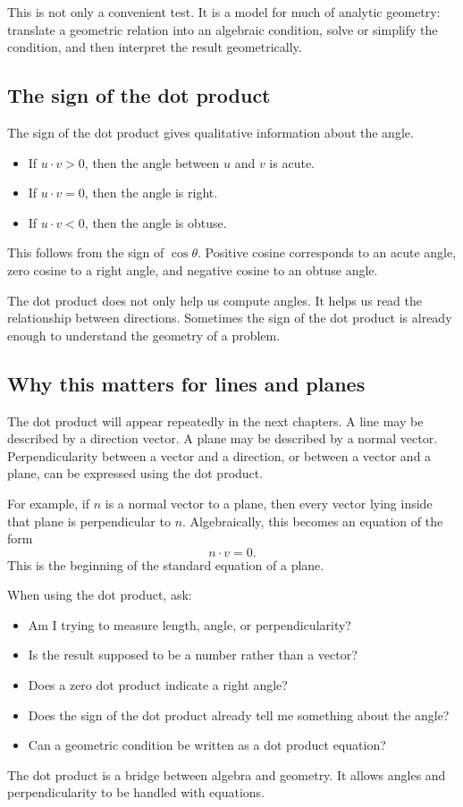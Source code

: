 This is not only a convenient test. It is a model for much of analytic geometry: translate a geometric relation into an algebraic condition, solve or simplify the condition, and then interpret the result geometrically.

\subsection*{The sign of the dot product}

The sign of the dot product gives qualitative information about the angle.

\begin{itemize}
\item If \(u\cdot v>0\), then the angle between \(u\) and \(v\) is acute.
\item If \(u\cdot v=0\), then the angle is right.
\item If \(u\cdot v<0\), then the angle is obtuse.
\end{itemize}

This follows from the sign of \(\cos\theta\). Positive cosine corresponds to an acute angle, zero cosine to a right angle, and negative cosine to an obtuse angle.

\begin{remarkbox}
The dot product does not only help us compute angles. It helps us read the relationship between directions. Sometimes the sign of the dot product is already enough to understand the geometry of a problem.
\end{remarkbox}

\subsection*{Why this matters for lines and planes}

The dot product will appear repeatedly in the next chapters. A line may be described by a direction vector. A plane may be described by a normal vector. Perpendicularity between a vector and a direction, or between a vector and a plane, can be expressed using the dot product.

For example, if \(n\) is a normal vector to a plane, then every vector lying inside that plane is perpendicular to \(n\). Algebraically, this becomes an equation of the form
\[
n\cdot v=0.
\]
This is the beginning of the standard equation of a plane.

\begin{summarybox}
When using the dot product, ask:
\begin{itemize}
\item Am I trying to measure length, angle, or perpendicularity?
\item Is the result supposed to be a number rather than a vector?
\item Does a zero dot product indicate a right angle?
\item Does the sign of the dot product already tell me something about the angle?
\item Can a geometric condition be written as a dot product equation?
\end{itemize}
\end{summarybox}

The dot product is a bridge between algebra and geometry. It allows angles and perpendicularity to be handled with equations.